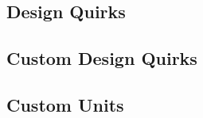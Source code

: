 \subsection{Design Quirks}



\subsection{Custom Design Quirks}



\newpage

\subsection{Custom Units}



\newpage
